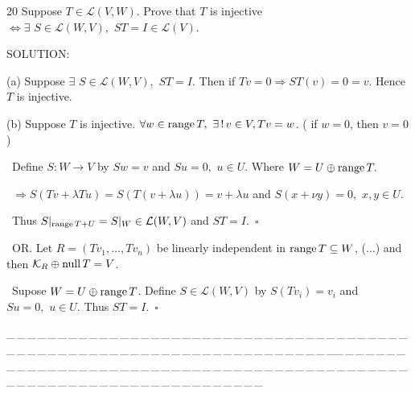 \documentclass[a4paper, 11pt, UTF8]{article}
\def\range{\textup{range}\,}
\def\null{\textup{null\,}}
\def\Lm{\mathcal{L}}
\begin{document}
\begin{large}
{\timesbf\Large 20} {\timessl\Large 
Suppose $T\in\Lm(V, W)$. Prove that $T$ is injective $\Longleftrightarrow\exists\,\,S\in\Lm(W, V),\,\,ST=I\in\Lm(V)$.}\par
{\timesbf S\footnotesize{OLUTION:}}\par\quad
(a) Suppose $\exists\,\,S\in\Lm(W, V),\,\,ST=I$. Then if $Tv=0\Rightarrow ST(v)=0=v.$ Hence $T$ is injective.\par\quad
(b) Suppose $T$ is injective. $\forall w\in\range T,\,\,\exists\,!\,v\in V,Tv=w$. ( if $w=0$, then $v=0$ )\par\qquad\,
Define $S:W\rightarrow V$ by $Sw=v$ and $Su=0,\,\,u\in U$. Where $W=U\oplus\range T.$\par\qquad\,
$\Rightarrow S(Tv+\lambda Tu)=S(T(v+\lambda u))=v+\lambda u$ and $S(x+\nu y)=0,\,\,x,y\in U$.\par\qquad\,
Thus $S|_{\range T+U}=S|_W\in\Lm(W,V)$ and $ST=I.\,\,\,\square$\par\qquad\,
{O\small R.} Let $R=(Tv_1,\dots,Tv_n)$ be linearly independent in $\range T\subseteq W$, ($\dots$) and then $\mathcal{K}_R\oplus\null T=V$.\par\qquad\,
Supose $W=U\oplus\range T$. Define $S\in\Lm(W,V)$ by $S(Tv_i)=v_i$ and $Su=0,\,\,u\in U.$ Thus $ST=I.\,\,\,\square$
\par
{\tiny \_\,\_\,\_\,\_\,\_\,\_\,\_\,\_\,\_\,\_\,\_\,\_\,\_\,\_\,\_\,\_\,\_\,\_\,\_\,\_\,\_\,\_\,\_\,\_\,\_\,\_\,\_\,\_\,\_\,\_\,\_\,\_\,\_\,\_\,\_\,\_\,\_\,\_\,\_\,\_\,\_\,\_\,\_\,\_\,\_\,\_\,\_\,\_\,\_\,\_\,\_\,\_\,\_\,\_\,\_\,\_\,\_\,\_\,\_\,\_\,\_\,\_\,\_\,\_\,\_\,\_\,\_\,\_\,\_\,\_\,\_\_\,\_\,\_\,\_\,\_\,\_\,\_\,\_\,\_\,\_\,\_\,\_\,\_\,\_\,\_\,\_\,\_\,\_\,\_\,\_\,\_\,\_\,\_\,\_\,\_\,\_\,\_\,\_\,\_\,\_\,\_\,\_\,\_\,\_\,\_\,\_\,\_\,\_\,\_\,\_\,\_\,\_\,\_\,\_\,\_\,\_\,\_\,\_\,\_\,\_\,\_\,\_\,\_\,\_\,\_\,\_\,\_\,\_\,\_\,\_\,\_\,\_\,\_\,\_\,\_\,\_\,\_\,\_\,\_\,\_\,\_}\par


\end{large}
\end{document}

